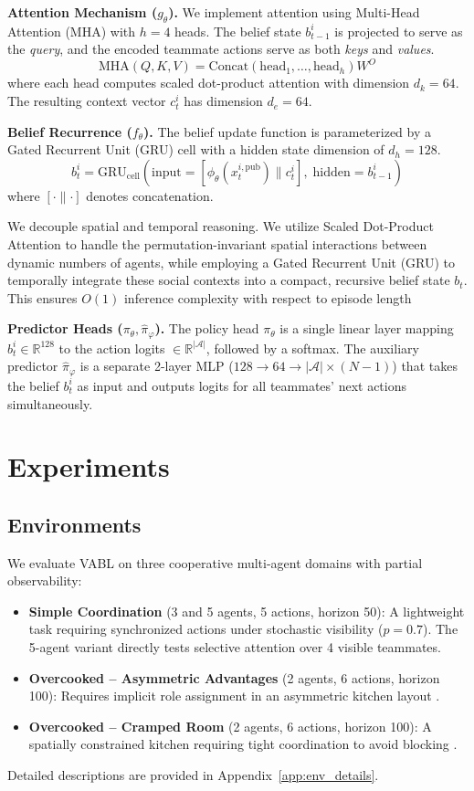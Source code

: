 \documentclass{article}
\theoremstyle{plain}
\theoremstyle{definition}
\theoremstyle{remark}
\begin{document}
\textbf{Attention Mechanism ($g_\theta$).}
We implement attention using Multi-Head Attention (MHA) with $h=4$ heads. The belief state $b_{t-1}^i$ is projected to serve as the \textit{query}, and the encoded teammate actions serve as both \textit{keys} and \textit{values}.
\[ \mathrm{MHA}(Q, K, V) = \mathrm{Concat}(\mathrm{head}_1, \ldots, \mathrm{head}_h)W^O \]
where each head computes scaled dot-product attention with dimension $d_k = 64$. The resulting context vector $c_t^i$ has dimension $d_e = 64$.

\textbf{Belief Recurrence ($f_\theta$).}
The belief update function is parameterized by a Gated Recurrent Unit (GRU) cell with a hidden state dimension of $d_h = 128$.
\[ b_t^i = \mathrm{GRU}_{\mathrm{cell}}\left( \text{input} = [\phi_\theta(x_t^{i,\mathrm{pub}}) \parallel c_t^i], \; \text{hidden} = b_{t-1}^i \right) \]
where $[\cdot \parallel \cdot]$ denotes concatenation.

We decouple spatial and temporal reasoning. We utilize Scaled Dot-Product Attention to handle the permutation-invariant spatial interactions between dynamic numbers of agents, while employing a Gated Recurrent Unit (GRU) to temporally integrate these social contexts into a compact, recursive belief state $b_t$. This ensures $O(1)$ inference complexity with respect to episode length

\textbf{Predictor Heads ($\pi_\theta, \hat{\pi}_\varphi$).}
The policy head $\pi_\theta$ is a single linear layer mapping $b_t^i \in \mathbb{R}^{128}$ to the action logits $\in \mathbb{R}^{|\mathcal{A}|}$, followed by a softmax. The auxiliary predictor $\hat{\pi}_\varphi$ is a separate 2-layer MLP ($128 \to 64 \to |\mathcal{A}| \times (N{-}1)$) that takes the belief $b_t^i$ as input and outputs logits for all teammates' next actions simultaneously.



\section{Experiments}
\label{sec:experiments}

\subsection{Environments}
We evaluate VABL on three cooperative multi-agent domains with partial observability:
\begin{itemize}
\item \textbf{Simple Coordination} (3 and 5 agents, 5 actions, horizon 50): A lightweight task requiring synchronized actions under stochastic visibility ($p=0.7$). The 5-agent variant directly tests selective attention over 4 visible teammates.
\item \textbf{Overcooked -- Asymmetric Advantages} (2 agents, 6 actions, horizon 100): Requires implicit role assignment in an asymmetric kitchen layout \cite{carroll2019utility}.
\item \textbf{Overcooked -- Cramped Room} (2 agents, 6 actions, horizon 100): A spatially constrained kitchen requiring tight coordination to avoid blocking \cite{carroll2019utility}.
\end{itemize}
Detailed descriptions are provided in Appendix~\ref{app:env_details}.
\end{document}

